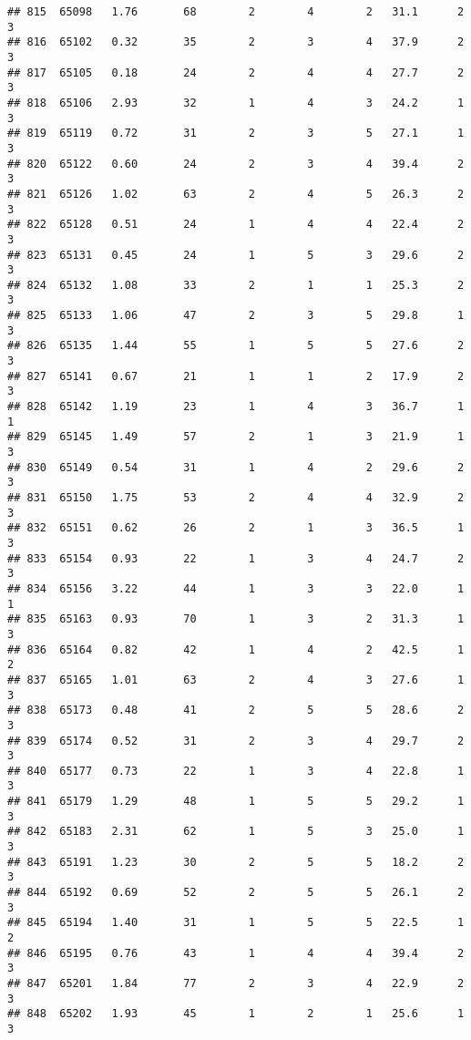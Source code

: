 \documentclass[
]{article}
\begin{document}
\begin{verbatim}
## 815  65098   1.76       68        2        4        2   31.1      2      3
## 816  65102   0.32       35        2        3        4   37.9      2      3
## 817  65105   0.18       24        2        4        4   27.7      2      3
## 818  65106   2.93       32        1        4        3   24.2      1      3
## 819  65119   0.72       31        2        3        5   27.1      1      3
## 820  65122   0.60       24        2        3        4   39.4      2      3
## 821  65126   1.02       63        2        4        5   26.3      2      3
## 822  65128   0.51       24        1        4        4   22.4      2      3
## 823  65131   0.45       24        1        5        3   29.6      2      3
## 824  65132   1.08       33        2        1        1   25.3      2      3
## 825  65133   1.06       47        2        3        5   29.8      1      3
## 826  65135   1.44       55        1        5        5   27.6      2      3
## 827  65141   0.67       21        1        1        2   17.9      2      3
## 828  65142   1.19       23        1        4        3   36.7      1      1
## 829  65145   1.49       57        2        1        3   21.9      1      3
## 830  65149   0.54       31        1        4        2   29.6      2      3
## 831  65150   1.75       53        2        4        4   32.9      2      3
## 832  65151   0.62       26        2        1        3   36.5      1      3
## 833  65154   0.93       22        1        3        4   24.7      2      3
## 834  65156   3.22       44        1        3        3   22.0      1      1
## 835  65163   0.93       70        1        3        2   31.3      1      3
## 836  65164   0.82       42        1        4        2   42.5      1      2
## 837  65165   1.01       63        2        4        3   27.6      1      3
## 838  65173   0.48       41        2        5        5   28.6      2      3
## 839  65174   0.52       31        2        3        4   29.7      2      3
## 840  65177   0.73       22        1        3        4   22.8      1      3
## 841  65179   1.29       48        1        5        5   29.2      1      3
## 842  65183   2.31       62        1        5        3   25.0      1      3
## 843  65191   1.23       30        2        5        5   18.2      2      3
## 844  65192   0.69       52        2        5        5   26.1      2      3
## 845  65194   1.40       31        1        5        5   22.5      1      2
## 846  65195   0.76       43        1        4        4   39.4      2      3
## 847  65201   1.84       77        2        3        4   22.9      2      3
## 848  65202   1.93       45        1        2        1   25.6      1      3

\end{verbatim}
\end{document}
